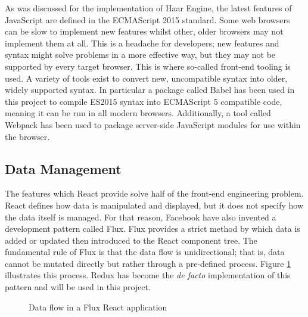       As was discussed for the implementation of Haar Engine, the latest features of JavaScript are defined in the ECMAScript 2015 standard. Some web browsers can be slow to implement new features whilst other, older browsers may not implement them at all. This is a headache for developers; new features and syntax might solve problems in a more effective way, but they may not be supported by every target browser. This is where so-called front-end tooling is used. A variety of tools exist to convert new, uncompatible syntax into older, widely supported syntax. In particular a package called Babel has been used in this project to compile ES2015 syntax into ECMAScript 5 compatible code, meaning it can be run in all modern browsers. Additionally, a tool called Webpack has been used to package server-side JavaScript modules for use within the browser.

    \subsection{Data Management}
      The features which React provide solve half of the front-end engineering problem. React defines how data is manipulated and displayed, but it does not specify how the data itself is managed. For that reason, Facebook have also invented a development pattern called Flux. Flux provides a strict method by which data is added or updated then introduced to the React component tree. The fundamental rule of Flux is that the data flow is unidirectional; that is, data cannot be mutated directly but rather through a pre-defined process. Figure \ref{figure:flux-flow} illustrates this process. Redux has become the \textit{de facto} implementation of this pattern and will be used in this project.

      \begin{figure}
        \centering
      \caption{Data flow in a Flux React application}\label{figure:flux-flow}
      \end{figure}

